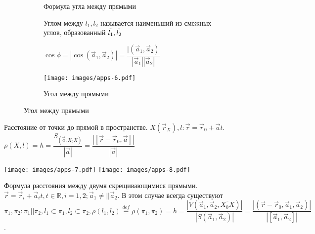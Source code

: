 \begin{enumerate}
	\begin{figure}[h]
		\begin{subfigure}[t!]{0.6\linewidth}
			\item Формула угла между прямыми
			\begin{definition}
				Углом между \(l_1, l_2\) называется наименьший из смежных углов, образованный \(\Tilde{l_1}, \Tilde{l_2}\) 
			\end{definition}
			\(\cos \phi = |\cos(\vec a_1, \vec a_2)| = \dfrac{|(\vec a_1, \vec a_2)}{|\vec a_1||\vec a_2|}\)
		\end{subfigure}
		\begin{subfigure}[b!]{0.4\linewidth}
			\centering
			\texttt{[image: images/apps-6.pdf]}
			\caption*{Угол между прямыми}
			\label{Apps4}
		\end{subfigure}
	\end{figure}
	\item Расстояние от точки до прямой в пространстве. \(X(\vec r_X), l: \vec r = \vec r_0 + \vec at\). \(\rho(X, l) = h = \dfrac{S_{(\vec a, \overline{X_0X})}}{|\vec a|} = \dfrac{|[\vec r - \vec r_0, \vec a]|}{|\vec a|}\)
	
	\vspace{.7cm}
	\hfill \texttt{[image: images/apps-7.pdf]} \hfill	\texttt{[image: images/apps-8.pdf]} \hfill 
	\vspace{.7cm}
	
	\item Формула расстояния между двумя скрещивающимися прямыми. \(\vec r = \vec r_i +\vec a_it, t\in\mathbb{R}, i = 1, 2; \vec a_1 \ne || \vec a_2\). В этом случае всегда существуют \(\pi_1, \pi_2: \pi_1||\pi_2, l_1\subset\pi_1, l_2\subset\pi_2, \rho(l_1, l_2) \overset{def}{\equiv} \rho(\pi_1, \pi_2) = h = \dfrac{|V(\vec a_1, \vec a_2, \overline{X_0X})|}{|S(\vec a_1, \vec a_2)|} = \dfrac{|(\vec r- \vec r_0, \vec a_1, \vec a_2)|}{|[\vec a_1, \vec a_2]|}\).
\end{enumerate}

